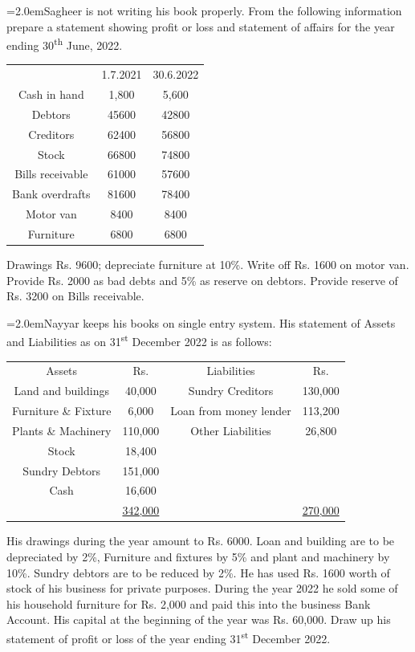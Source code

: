\documentclass[11pt,a4paper]{article}
\newcommand{\lqn}[2]{\Needspace{6\baselineskip}\par\medskip\noindent\hangindent=2.0em\hangafter=1\makebox[2.0em][l]{\textbf{#1.}}#2\par}
\begin{document}
\lqn{9}{Sagheer is not writing his book properly. From the following information prepare a statement showing profit or loss and statement of affairs for the year ending 30\textsuperscript{th}  June, 2022.\par
\par\smallskip\noindent\hspace*{1.2em}\begin{tabular}{|ccc|}
\hline
 & 1.7.2021 & 30.6.2022 \\
Cash in hand & 1,800 & 5,600 \\
Debtors & 45600 & 42800 \\
Creditors & 62400 & 56800 \\
Stock & 66800 & 74800 \\
Bills receivable & 61000 & 57600 \\
Bank overdrafts & 81600 & 78400 \\
Motor van & 8400 & 8400 \\
Furniture & 6800 & 6800 \\
\hline
\end{tabular}\par\smallskip
Drawings Rs. 9600; depreciate furniture at 10\%. Write off Rs. 1600 on motor van. Provide Rs. 2000 as bad debts and 5\% as reserve on debtors. Provide reserve of Rs. 3200 on Bills receivable.\par
}
\lqn{10}{Nayyar keeps his books on single entry system. His statement of Assets and Liabilities as on 31\textsuperscript{st}  December 2022 is as follows:\par
\par\smallskip\noindent\hspace*{1.2em}\begin{tabular}{|cccc|}
\hline
Assets & Rs. & Liabilities & Rs. \\
Land and buildings & 40,000 & Sundry Creditors & 130,000 \\
Furniture \& Fixture & 6,000 & Loan from money lender & 113,200 \\
Plants \& Machinery & 110,000 & Other Liabilities & 26,800 \\
Stock & 18,400 &  &  \\
Sundry Debtors & 151,000 &  &  \\
Cash & 16,600 &  &  \\
 & \underline{342,000} &  & \underline{270,000} \\
\hline
\end{tabular}\par\smallskip
His drawings during the year amount to Rs. 6000. Loan and building are to be depreciated by 2\%, Furniture and fixtures by 5\% and plant and machinery by 10\%. Sundry debtors are to be reduced by 2\%. He has used Rs. 1600 worth of stock of his business for private purposes. During the year 2022 he sold some of his household furniture for Rs. 2,000 and paid this into the business Bank Account.  His capital at the beginning of the year was Rs. 60,000. Draw up his statement of profit or loss of the year ending 31\textsuperscript{st}  December 2022.\par
}
\end{document}
